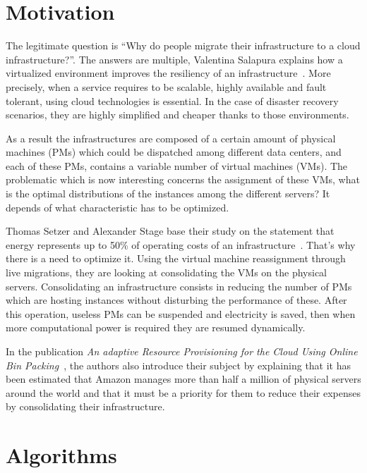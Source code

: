 \section{Motivation}

The legitimate question is “Why do people migrate their infrastructure to a
cloud infrastructure?”. The answers are multiple, Valentina Salapura explains
how a virtualized environment improves the resiliency of an
infrastructure~\citep*{virtresiliency}. More precisely, when a service requires
to be scalable, highly available and fault tolerant, using cloud technologies
is essential. In the case of disaster recovery scenarios, they are highly
simplified and cheaper thanks to those environments.

As a result the infrastructures are composed of a certain amount of physical
machines (PMs) which could be dispatched among different data centers, and each
of these PMs, contains a variable number of virtual machines (VMs). The
problematic which is now interesting concerns the assignment of these VMs, what
is the optimal distributions of the instances among the different servers? It
depends of what characteristic has to be optimized.

Thomas Setzer and Alexander Stage base their study on the statement that energy
represents up to 50\% of operating costs of an
infrastructure~\citep*{reassignmentElectricitysaving}. That's why there is a need
to optimize it. Using the virtual machine reassignment through live migrations,
they are looking at consolidating the VMs on the physical servers.
Consolidating an infrastructure consists in reducing the number of PMs which
are hosting instances without disturbing the performance of these.  After this
operation, useless PMs can be suspended and electricity is saved, then when
more computational power is required they are resumed dynamically.

In the publication \textit{An adaptive Resource Provisioning for the Cloud
Using Online Bin Packing}~\citep*{reassignmentBinpacking1}, the authors also
introduce their subject by explaining that it has been estimated that Amazon
manages more than half a million of physical servers around the world and that
it must be a priority for them to reduce their expenses by consolidating
their infrastructure.

\section{Algorithms}

